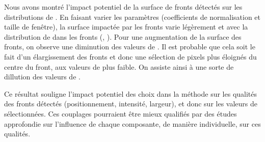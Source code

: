 Nous avons montré l'impact potentiel de la surface de fronts détectés sur les distributions de .
En faisant varier les paramètres (coefficients de normalisation et taille de fenêtre), la surface impactée par les fronts varie légèrement et avec la distribution de  dans les fronts (, ).
Pour une augmentation de la surface des fronts, on observe une diminution des valeurs de .
Il est probable que cela soit le fait d'un élargissement des fronts et donc une sélection de pixels plus éloignés du centre du front, aux valeurs de  plus faible.
On assiste ainsi à une sorte de dillution des valeurs de .

Ce résultat souligne l'impact potentiel des choix dans la méthode sur les qualités des fronts détectés (positionnement, intensité, largeur), et donc sur les valeurs de  sélectionnées.
Ces couplages pourraient être mieux qualifiés par des études approfondie sur l'influence de chaque composante, de manière individuelle, sur ces qualités.




